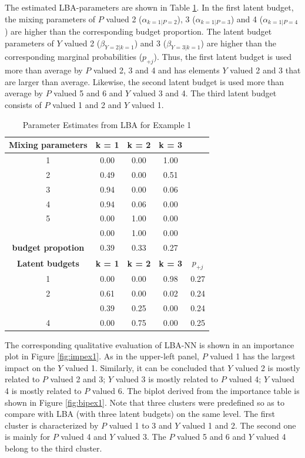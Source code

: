 \documentclass[]{interact}
\theoremstyle{plain}%
\theoremstyle{definition}
\theoremstyle{remark}
\begin{document}
The estimated LBA-parameters are shown in Table \ref{tab:lbaex1}. In the
first latent budget, the mixing parameters of \(P\) valued 2
(\(\alpha_{k=1|P=2}\)), 3 (\(\alpha_{k=1|P=3}\)) and 4
(\(\alpha_{k=1|P=4}\)) are higher than the corresponding budget
proportion. The latent budget parameters of \(Y\) valued 2
(\(\beta_{Y=2|k=1}\)) and 3 (\(\beta_{Y=3|k=1}\)) are higher than the
corresponding marginal probabilities (\(p_{+j}\)). Thus, the first
latent budget is used more than average by \(P\) valued 2, 3 and 4 and
has elements \(Y\) valued 2 and 3 that are larger than average.
Likewise, the second latent budget is used more than average by \(P\)
valued 5 and 6 and \(Y\) valued 3 and 4. The third latent budget
consists of \(P\) valued 1 and 2 and \(Y\) valued 1.

\begin{table}[H]

\caption{\label{tab:lbaex1}Parameter Estimates from LBA for Example 1}
\centering
\begin{tabular}[t]{ccccc}
\toprule
\textbf{Mixing parameters} & \textbf{k = 1} & \textbf{k = 2} & \textbf{k = 3} & \textbf{}\\
\midrule
1 & 0.00 & 0.00 & 1.00 & \\
2 & 0.49 & 0.00 & 0.51 & \\
3 & 0.94 & 0.00 & 0.06 & \\
4 & 0.94 & 0.06 & 0.00 & \\
5 & 0.00 & 1.00 & 0.00 & \\
\addlinespace
6 & 0.00 & 1.00 & 0.00 & \\
\textbf{budget propotion} & 0.39 & 0.33 & 0.27 & \\
\textbf{Latent budgets} & \textbf{k = 1} & \textbf{k = 2} & \textbf{k = 3} & $p_{+j}$\\
1 & 0.00 & 0.00 & 0.98 & 0.27\\
2 & 0.61 & 0.00 & 0.02 & 0.24\\
\addlinespace
3 & 0.39 & 0.25 & 0.00 & 0.24\\
4 & 0.00 & 0.75 & 0.00 & 0.25\\
\bottomrule
\end{tabular}
\end{table}

The corresponding qualitative evaluation of LBA-NN is shown in an
importance plot in Figure \ref{fig:impex1}. As in the upper-left panel,
\(P\) valued 1 has the largest impact on the \(Y\) valued 1. Similarly,
it can be concluded that \(Y\) valued 2 is mostly related to \(P\)
valued 2 and 3; \(Y\) valued 3 is mostly related to \(P\) valued 4;
\(Y\) valued 4 is mostly related to \(P\) valued 6. The biplot derived
from the importance table is shown in Figure \ref{fig:bipex1}. Note that
three clusters were predefined so as to compare with LBA (with three
latent budgets) on the same level. The first cluster is characterized by
\(P\) valued 1 to 3 and \(Y\) valued 1 and 2. The second one is mainly
for \(P\) valued 4 and \(Y\) valued 3. The \(P\) valued 5 and 6 and
\(Y\) valued 4 belong to the third cluster.
\end{document}
